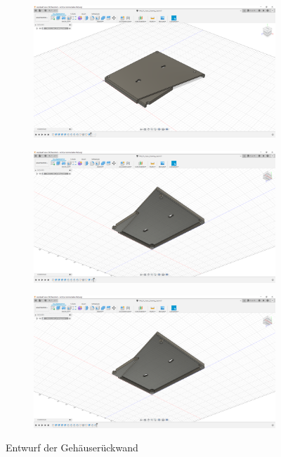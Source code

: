 \begin{figure}[h!tb]
\begin{subfigure}[t]{.3\linewidth}
		\caption[]{}
		\label{fig:design-back-12}
	\end{subfigure}
	\begin{subfigure}[t]{.3\linewidth}
		\includegraphics[width=\linewidth]{img/konstruktion_gehaeuse_hinten_013.png}
		\caption[]{}
		\label{fig:design-back-13}
	\end{subfigure}
	\begin{subfigure}[t]{.3\linewidth}
		\includegraphics[width=\linewidth]{img/konstruktion_gehaeuse_hinten_014.png}
		\caption[]{}
		\label{fig:design-back-14}
	\end{subfigure}
	\begin{subfigure}[t]{.3\linewidth}
		\includegraphics[width=\linewidth]{img/konstruktion_gehaeuse_hinten_015.png}
		\caption[]{}
		\label{fig:design-back-15}
	\end{subfigure}
	\caption[Entwurf der Gehäuserückwand]{Entwurf der Gehäuserückwand}
	\label{fig:design-back}
\end{figure}\par
\newpage